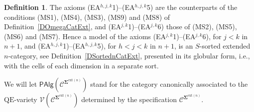 \documentclass{amsart}
\theoremstyle{plain}
\theoremstyle{definition}
\newtheorem{definition}[theorem]{Definition}
\begin{document}
\begin{definition}
The axioms (EA$^{h,j,k}$1)--(EA$^{h,j,k}$5) are the counterparts of the conditions (MS1), (MS4), (MS3), (MS9) and (MS8) of Definition~\ref{DOmegaCatExt}, and (EA$^{j,k}$1)--(EA$^{j,k}$6) those of (MS2), (MS5), (MS6) and (MS7). Hence a model of the axioms (EA$^{j,k}$1)--(EA$^{j,k}$6), for $j<k$ in $n+1$, and (EA$^{h,j,k}$1)--(EA$^{h,j,k}$5), for $h<j<k$ in $n+1$, is an $S$-sorted extended $n$-category, see Definition~\ref{DSortednCatExt}, presented in its globular form, i.e., with the cells of each dimension in a separate sort.

We will let $\mathsf{PAlg}(\boldsymbol{\mathcal{C}}^{\mathbf{\Sigma}^{\mathrm{ext}(n)}})$ stand for the category canonically associated to the $\mathrm{QE}$-variety $\mathcal{V}(\boldsymbol{\mathcal{C}}^{\mathbf{\Sigma}^{\mathrm{ext}(n)}})$ determined by the specification $\boldsymbol{\mathcal{C}}^{\mathbf{\Sigma}^{\mathrm{ext}(n)}}$.
\end{definition}

\end{document}
